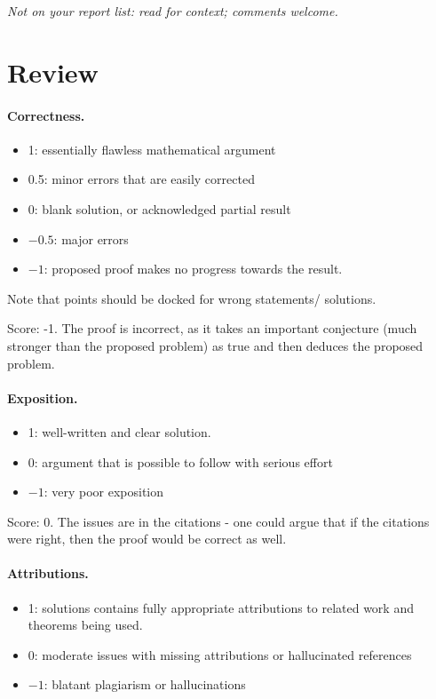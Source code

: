 \documentclass[11pt]{article}
\theoremstyle{definition}
\begin{document}
\maketitle
\noindent\textit{Not on your report list: read for context; comments welcome.}

\section{Review}

\paragraph{Correctness.}
\begin{itemize}
	\item  1: essentially flawless mathematical argument
	\item  0.5: minor errors that are easily corrected
	\item  0: blank solution, or acknowledged partial result
	\item  $-0.5$: major errors
	\item  $-1$: proposed proof makes no progress towards the result.
\end{itemize}
Note that points should be docked for wrong statements/ solutions.

\noindent Score: -1. The proof is incorrect, as it takes an important conjecture (much stronger than the proposed problem) as true and then deduces the proposed problem.

\paragraph{Exposition.}
\begin{itemize}
	\item  1: well-written and clear solution.
	\item  0: argument that is possible to follow with serious effort
	\item  $-1$: very poor exposition
\end{itemize}

\noindent Score: 0.
The issues are in the citations - one could argue that if the citations were right, then the proof would be correct as well.

\paragraph{Attributions.}
\begin{itemize}
	\item  1: solutions contains fully appropriate attributions
		to related work and theorems being used.
	\item  0: moderate issues with missing attributions or hallucinated references
	\item  $-1$: blatant plagiarism or hallucinations
\end{itemize}
\end{document}

